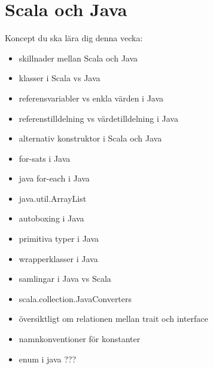 \chapter{Scala och Java}\label{chapter:W11}
Koncept du ska lära dig denna vecka:
\begin{multicols}{2}\begin{itemize}[nosep,label={$\square$},leftmargin=*]
\item skillnader mellan Scala och Java
\item klasser i Scala vs Java
\item referensvariabler vs enkla värden i Java
\item referenstilldelning vs värdetilldelning i Java
\item alternativ konstruktor i Scala och Java
\item for-sats i Java
\item java for-each i Java
\item java.util.ArrayList
\item autoboxing i Java
\item primitiva typer i Java
\item wrapperklasser i Java
\item samlingar i Java vs Scala
\item scala.collection.JavaConverters
\item översiktligt om relationen mellan trait och interface
\item namnkonventioner för konstanter
\item enum i java ???\end{itemize}\end{multicols}
